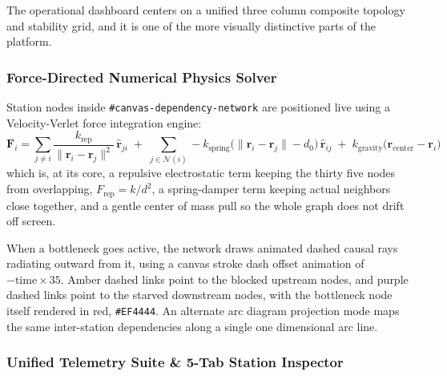 \documentclass[11pt]{article}
\begin{document}
The operational dashboard centers on a unified three column composite topology and stability grid, and it is one of the more visually distinctive parts of the platform.

\subsubsection{Force-Directed Numerical Physics Solver}

Station nodes inside \texttt{\#canvas-dependency-network} are positioned live using a Velocity-Verlet force integration engine:
\begin{equation}
\mathbf{F}_i = \sum_{j \neq i} \frac{k_{\text{rep}}}{\lVert \mathbf{r}_i - \mathbf{r}_j \rVert^2}\, \hat{\mathbf{r}}_{ji}
\;+\; \sum_{j \in \mathcal{N}(i)} -k_{\text{spring}}\big(\lVert \mathbf{r}_i - \mathbf{r}_j \rVert - d_0\big)\, \hat{\mathbf{r}}_{ij}
\;+\; k_{\text{gravity}}\big(\mathbf{r}_{\text{center}} - \mathbf{r}_i\big)
\end{equation}
which is, at its core, a repulsive electrostatic term keeping the thirty five nodes from overlapping, $F_{\text{rep}} = k / d^2$, a spring-damper term keeping actual neighbors close together, and a gentle center of mass pull so the whole graph does not drift off screen.

When a bottleneck goes active, the network draws animated dashed causal rays radiating outward from it, using a canvas stroke dash offset animation of \(-\text{time} \times 35\). Amber dashed links point to the blocked upstream nodes, and purple dashed links point to the starved downstream nodes, with the bottleneck node itself rendered in red, \texttt{\#EF4444}. An alternate arc diagram projection mode maps the same inter-station dependencies along a single one dimensional arc line.

\subsubsection{Unified Telemetry Suite \& 5-Tab Station Inspector}
\end{document}
